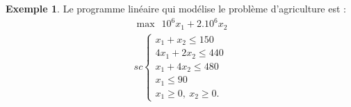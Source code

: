 \documentclass[a4paper,12pt,openany]{book}
\theoremstyle{plain}
\theoremstyle{definition}
\newtheorem{exemple}[theorem]{Exemple}
\theoremstyle{remark}
\theoremstyle{nbstyle}
\begin{document}
\begin{exemple}
		Le programme linéaire qui modélise le problème d'agriculture est :
		\begin{equation}\label{key}
		\begin{array}{lc}
		\displaystyle\max\:\:10^{6}x_{1}+2.10^{6}x_{2}  \\
		sc \left\lbrace \begin{array}{llc}
		x_{1}+x_{2}\leq150 \\
		4x_{1}+2x_{2}\leq440\\
		x_{1}+4x_{2}\leq480 \\
		x_{1}\leq 90 \\
		x_{1}\geq0,\: x_{2}\geq0.
		\end{array}\right.
		\end{array}
		\end{equation}
	\end{exemple}
	
\end{document}
